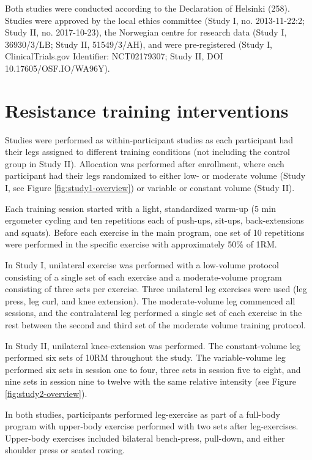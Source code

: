 \documentclass[twoside,10pt]{gihclass} %
\begin{document}
Both studies were conducted according to the Declaration of Helsinki
(258).
Studies were approved by the local ethics committee (Study I, no. 2013-11-22:2; Study II, no. 2017-10-23), the Norwegian centre for research data (Study I, 36930/3/LB; Study II, 51549/3/AH), and were pre-registered (Study I, ClinicalTrials.gov Identifier: NCT02179307; Study II, DOI 10.17605/OSF.IO/WA96Y).

\hypertarget{resistance-training-interventions}{%
\section{Resistance training interventions}\label{resistance-training-interventions}}

Studies were performed as within-participant studies
as each participant had their legs assigned to different training
conditions (not including the control group in Study II). Allocation was
performed after enrollment, where each participant had their legs
randomized to either low- or moderate volume (Study I, see Figure \ref{fig:study1-overview}) or variable or constant volume (Study II).

Each training session started with a light, standardized warm-up (5 min
ergometer cycling and ten repetitions each of push-ups, sit-ups,
back-extensions and squats). Before each exercise in the main program,
one set of 10 repetitions were performed in the specific exercise with
approximately 50\% of 1RM.

In Study I, unilateral exercise was performed with a low-volume protocol consisting of a single set of each exercise and a moderate-volume program consisting of three sets per exercise.
Three unilateral leg exercises were used (leg press, leg curl, and knee
extension). The moderate-volume leg commenced all sessions, and the contralateral leg performed a single set of each exercise in the rest between the second and third set of the moderate volume training protocol.

In Study II, unilateral knee-extension was performed. The constant-volume leg performed six sets of 10RM throughout the study. The variable-volume leg performed six sets in session one to four, three sets in session five to eight, and nine sets in session nine to twelve with the same relative intensity (see Figure \ref{fig:study2-overview}).

In both studies, participants performed leg-exercise as part of a full-body program with upper-body exercise performed with two sets after leg-exercises. Upper-body exercises included bilateral bench-press, pull-down, and either shoulder press or seated rowing.
\end{document}
